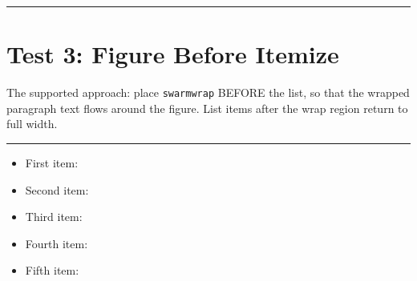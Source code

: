 \documentclass[a4paper,11pt]{article}
\begin{document}
\begin{swarmwrap}%
  \begin{minipage}[t]{3cm}
    \centering
    \rule{\linewidth}{7.8cm}
    \label{fig:tall}
  \end{minipage}%
\end{swarmwrap}%
\swarmwrapnext
\lipsum[1]\lipsum[2]\lipsum[3]%

\newpage
\section*{Test 3: Figure Before Itemize}
The supported approach: place \texttt{swarmwrap} BEFORE the list, so that
the wrapped paragraph text flows around the figure. List items after the
wrap region return to full width.

\begin{swarmwrap}%
  \begin{minipage}[t]{3cm}
    \centering
    \rule{\linewidth}{2.8cm}
    \label{fig:before-itemize}
  \end{minipage}%
\end{swarmwrap}%
\swarmwrapnext
\lipsum[1]

\begin{itemize}
  \item First item: \lipsum[2][1-3]
  \item Second item: \lipsum[3][1-3]
  \item Third item: \lipsum[4][1-3]
  \item Fourth item: \lipsum[5][1-3]
  \item Fifth item: \lipsum[6][1-3]
\end{itemize}

\newpage
%
\end{document}
